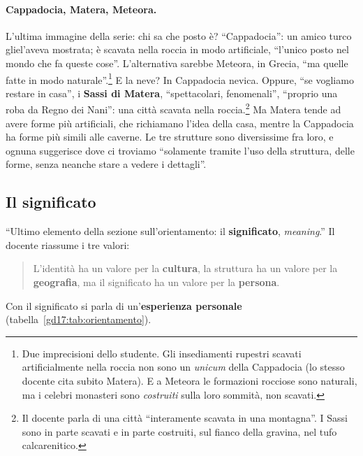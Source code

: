 \paragraph{Cappadocia, Matera, Meteora.} L'ultima immagine della serie: chi sa che posto
è? ``Cappadocia'': un amico turco gliel'aveva mostrata; è scavata nella roccia in modo
artificiale, ``l'unico posto nel mondo che fa queste cose''. L'alternativa sarebbe
Meteora, in Grecia, ``ma quelle fatte in modo naturale''.\footnote{Due imprecisioni dello
studente. Gli insediamenti rupestri scavati artificialmente nella roccia non sono un
\emph{unicum} della Cappadocia (lo stesso docente cita subito Matera). E a Meteora le
formazioni rocciose sono naturali, ma i celebri monasteri sono \emph{costruiti} sulla loro
sommità, non scavati.} E la neve? In Cappadocia nevica. Oppure, ``se vogliamo restare in
casa'', i \textbf{Sassi di Matera}, ``spettacolari, fenomenali'', ``proprio una roba da
Regno dei Nani'': una città scavata nella roccia.\footnote{Il docente parla di una città
``interamente scavata in una montagna''. I Sassi sono in parte scavati e in parte
costruiti, sul fianco della gravina, nel tufo calcarenitico.} Ma Matera tende ad avere
forme più artificiali, che richiamano l'idea della casa, mentre la Cappadocia ha forme più
simili alle caverne. Le tre strutture sono diversissime fra loro, e ognuna suggerisce dove
ci troviamo ``solamente tramite l'uso della struttura, delle forme, senza neanche stare a
vedere i dettagli''.

\subsection{Il significato}

``Ultimo elemento della sezione sull'orientamento: il \textbf{significato},
\emph{meaning}.'' Il docente riassume i tre valori:
\begin{quote}
L'identità ha un valore per la \textbf{cultura}, la struttura ha un valore per la
\textbf{geografia}, ma il significato ha un valore per la \textbf{persona}.
\end{quote}
Con il significato si parla di un'\textbf{esperienza personale} (tabella~\ref{gd17:tab:orientamento}).

